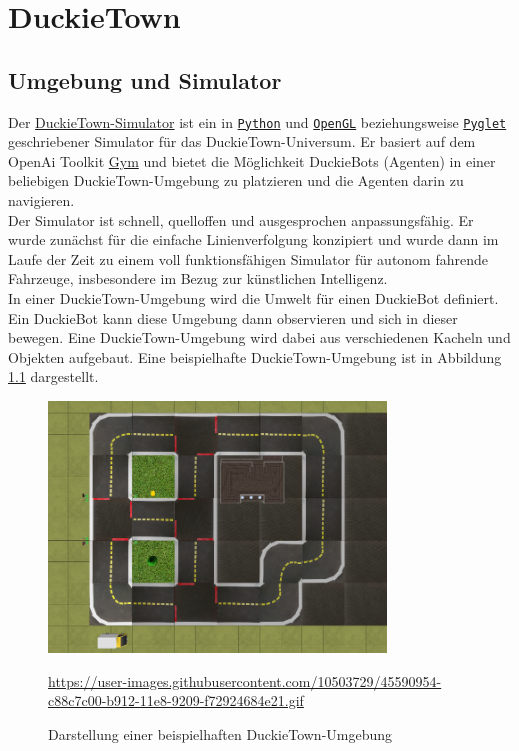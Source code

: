 \chapter{DuckieTown}

\section{Umgebung und Simulator}


Der \href{https://github.com/duckietown/gym-duckietown}{DuckieTown-Simulator} ist ein in \href{https://www.python.org/}{\texttt{Python}} und \href{https://www.opengl.org/}{\texttt{OpenGL}} beziehungsweise \href{http://pyglet.org/}{\texttt{Pyglet}} geschriebener Simulator für das \glqq DuckieTown-Universum\grqq. Er basiert auf dem OpenAi Toolkit \glqq \href{https://gym.openai.com/}{Gym}\grqq{} \cite{gym} und bietet die Möglichkeit DuckieBots (Agenten) in einer beliebigen DuckieTown-Umgebung zu platzieren und die Agenten darin zu navigieren. \cite{gym_duckietown} \\

Der Simulator ist schnell, quelloffen und ausgesprochen anpassungsfähig. Er wurde zunächst für die einfache Linienverfolgung konzipiert und wurde dann im Laufe der Zeit zu einem voll funktionsfähigen Simulator für autonom fahrende Fahrzeuge, insbesondere im Bezug zur künstlichen Intelligenz. \cite{gym_duckietown} \\

In einer DuckieTown-Umgebung wird die Umwelt für einen DuckieBot definiert. Ein DuckieBot kann diese Umgebung dann observieren und sich in dieser bewegen. Eine DuckieTown-Umgebung wird dabei aus verschiedenen Kacheln und Objekten aufgebaut. Eine beispielhafte DuckieTown-Umgebung ist in Abbildung \ref{duckietown-env} dargestellt.

\begin{figure}[H]
	\centering
	\includegraphics[width=0.8\textwidth]{kapitel2/images/duckietown-umgebung.png}
	\caption{Darstellung einer beispielhaften DuckieTown-Umgebung}
	\label{duckietown-env}
	\vspace{0.2cm}
	\quelle\url{https://user-images.githubusercontent.com/10503729/45590954-c88c7c00-b912-11e8-9209-f72924684e21.gif}
\end{figure}

